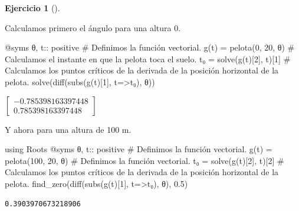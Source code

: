 \documentclass[
  a4paper,
]{scrreport}
\newenvironment{Shaded}{\begin{snugshade}}{\end{snugshade}}
\newcommand{\BuiltInTok}[1]{\textcolor[rgb]{0.00,0.23,0.31}{#1}}
\newcommand{\CommentTok}[1]{\textcolor[rgb]{0.37,0.37,0.37}{#1}}
\newcommand{\DataTypeTok}[1]{\textcolor[rgb]{0.68,0.00,0.00}{#1}}
\newcommand{\FloatTok}[1]{\textcolor[rgb]{0.68,0.00,0.00}{#1}}
\newcommand{\FunctionTok}[1]{\textcolor[rgb]{0.28,0.35,0.67}{#1}}
\newcommand{\ImportTok}[1]{\textcolor[rgb]{0.00,0.46,0.62}{#1}}
\newcommand{\NormalTok}[1]{\textcolor[rgb]{0.00,0.23,0.31}{#1}}
\newcommand{\OperatorTok}[1]{\textcolor[rgb]{0.37,0.37,0.37}{#1}}
\newcommand{\PreprocessorTok}[1]{\textcolor[rgb]{0.68,0.00,0.00}{#1}}
\theoremstyle{definition}
\newtheorem{exercise}{Ejercicio}[chapter]
\theoremstyle{remark}
\begin{document}
\begin{exercise}[]
\begin{enumerate}
\begin{tcolorbox}
  Calculamos primero el ángulo para una altura 0.

\begin{Shaded}
\begin{Highlighting}[]
\PreprocessorTok{@syms}\NormalTok{ θ, t}\OperatorTok{::}\DataTypeTok{ positive}
\CommentTok{\# Definimos la función vectorial.}
\FunctionTok{g}\NormalTok{(t) }\OperatorTok{=} \FunctionTok{pelota}\NormalTok{(}\FloatTok{0}\NormalTok{, }\FloatTok{20}\NormalTok{, θ)}
\CommentTok{\# Calculamos el instante en que la pelota toca el suelo.}
\NormalTok{t₀ }\OperatorTok{=} \FunctionTok{solve}\NormalTok{(}\FunctionTok{g}\NormalTok{(t)[}\FloatTok{2}\NormalTok{], t)[}\FloatTok{1}\NormalTok{]}
\CommentTok{\# Calculamos los puntos críticos de la derivada de la posición horizontal de la pelota.}
\FunctionTok{solve}\NormalTok{(}\FunctionTok{diff}\NormalTok{(}\FunctionTok{subs}\NormalTok{(}\FunctionTok{g}\NormalTok{(t)[}\FloatTok{1}\NormalTok{], t}\OperatorTok{=\textgreater{}}\NormalTok{t₀), θ))}
\end{Highlighting}
\end{Shaded}

  $\left[\begin{smallmatrix}-0.785398163397448\\0.785398163397448\end{smallmatrix}\right]$

  Y ahora para una altura de 100 m.

\begin{Shaded}
\begin{Highlighting}[]
\ImportTok{using} \BuiltInTok{Roots}
\PreprocessorTok{@syms}\NormalTok{ θ, t}\OperatorTok{::}\DataTypeTok{ positive}
\CommentTok{\# Definimos la función vectorial.}
\FunctionTok{g}\NormalTok{(t) }\OperatorTok{=} \FunctionTok{pelota}\NormalTok{(}\FloatTok{100}\NormalTok{, }\FloatTok{20}\NormalTok{, θ)}
\CommentTok{\# Definimos la función vectorial.}
\NormalTok{t₀ }\OperatorTok{=} \FunctionTok{solve}\NormalTok{(}\FunctionTok{g}\NormalTok{(t)[}\FloatTok{2}\NormalTok{], t)[}\FloatTok{2}\NormalTok{]}
\CommentTok{\# Calculamos los puntos críticos de la derivada de la posición horizontal de la pelota.}
\FunctionTok{find\_zero}\NormalTok{(}\FunctionTok{diff}\NormalTok{(}\FunctionTok{subs}\NormalTok{(}\FunctionTok{g}\NormalTok{(t)[}\FloatTok{1}\NormalTok{], t}\OperatorTok{=\textgreater{}}\NormalTok{t₀), θ), }\FloatTok{0.5}\NormalTok{)}
\end{Highlighting}
\end{Shaded}

\begin{verbatim}
0.3903970673218906
\end{verbatim}


\end{tcolorbox}
\end{enumerate}
\end{exercise}
\end{document}
